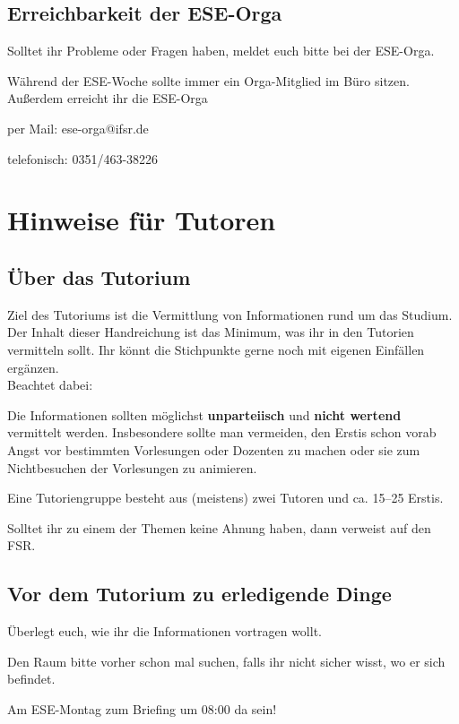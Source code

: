\documentclass[a4paper,12pt]{scrreprt}
\begin{document}
\section*{Erreichbarkeit der ESE-Orga}

Solltet ihr Probleme oder Fragen haben, meldet euch bitte bei der ESE-Orga.

Während der ESE-Woche sollte immer ein Orga-Mitglied im Büro sitzen.
Außerdem erreicht ihr die ESE-Orga
\begin{itemize*}
    \item per Mail: ese-orga@ifsr.de
    \item telefonisch: 0351/463-38226
\end{itemize*}


\tableofcontents
\chapter{Hinweise für Tutoren}

\section{Über das Tutorium}
Ziel des Tutoriums ist die Vermittlung von Informationen rund um das Studium. Der Inhalt dieser Handreichung ist das Minimum, was ihr in den Tutorien vermitteln sollt. Ihr könnt die Stichpunkte gerne noch mit eigenen Einfällen ergänzen.\\
Beachtet dabei:
\begin{itemize*}
\item Die Informationen sollten möglichst \textbf{unparteiisch} und \textbf{nicht wertend} vermittelt werden.
Insbesondere sollte man vermeiden, den Erstis schon vorab Angst vor bestimmten Vorlesungen oder Dozenten zu machen oder sie zum Nichtbesuchen der Vorlesungen zu animieren.
\item Eine Tutoriengruppe besteht aus (meistens) zwei Tutoren und ca. 15--25 Erstis.
\item Solltet ihr zu einem der Themen keine Ahnung haben, dann verweist auf den FSR\@.
\end{itemize*}

\section{Vor dem Tutorium zu erledigende Dinge}
\begin{itemize*}
    \item Überlegt euch, wie ihr die Informationen vortragen wollt.
    \item Den Raum bitte vorher schon mal suchen, falls ihr nicht sicher wisst, wo er sich befindet.
    \item Am ESE-Montag zum Briefing um 08:00 da sein!
\end{itemize*}
\end{document}

